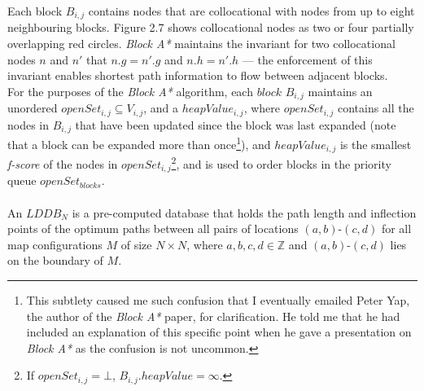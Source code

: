 \documentclass[12pt,notitlepage]{report}
\begin{document}
\noindent
Each block $B_{i,j}$ contains nodes that are collocational with nodes from up to eight neighbouring blocks. Figure 2.7 shows collocational nodes as two or four partially overlapping red circles. {\em Block A*} maintains the invariant for two collocational nodes $n$ and $n'$ that $n.g = n'.g$ and $n.h = n'.h$ --- the enforcement of this invariant enables shortest path information to flow between adjacent blocks.\\

\noindent
For the purposes of the {\em Block A*} algorithm, each $block$ $B_{i,j}$ maintains an unordered $openSet_{i,j} \subseteq V_{i,j}$, and a $heapValue_{i,j}$, where $openSet_{i,j}$ contains all the nodes in $B_{i,j}$ that have been updated since the block was last expanded (note that a block can be expanded more than once\footnote{This subtlety caused me such confusion that I eventually emailed Peter Yap, the author of the {\em Block A*} paper, for clarification. He told me that he had included an explanation of this specific point when he gave a presentation on {\em Block A*} as the confusion is not uncommon.}), and $heapValue_{i,j}$ is the smallest {\em f-score} of the nodes in $openSet_{i,j}$\footnote{If $openSet_{i,j} = \bot$, $B_{i,j}.heapValue = \infty$.}, and is used to order blocks in the priority queue $openSet_{blocks}$.\\


\\
\noindent
An $LDDB_{N}$ is a pre-computed database that holds the path length and inflection points of the optimum paths between all pairs of locations $(a,b)$-$(c,d)$ for all map configurations $M$ of size $N \times N$, where $a,b,c,d \in \mathbb{Z}$ and $(a,b)$-$(c,d)$ lies on the boundary of $M$.\\
\end{document}
